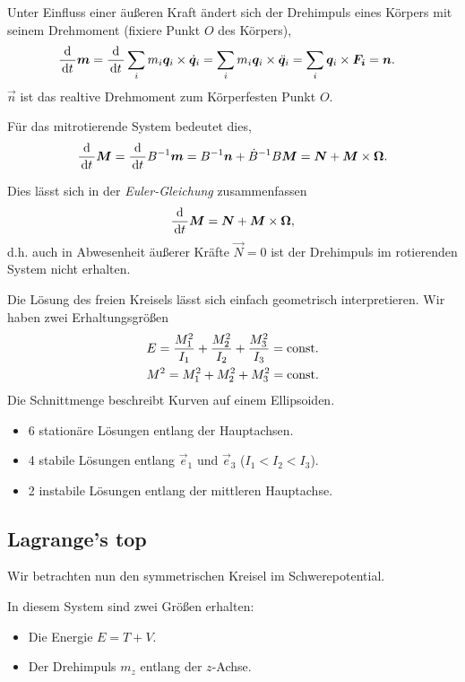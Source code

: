 Unter Einfluss einer äußeren Kraft ändert sich der Drehimpuls eines Körpers mit
seinem Drehmoment (fixiere Punkt $O$ des Körpers),
\begin{align*}
\frac{\mathrm{d}}{\,\mathrm{d} t\,}\bm{m} &= \frac{\mathrm{d}}{\,\mathrm{d} t\,}\sum_i
m_i\bm{q}_i\times\dot{\bm{q}}_i
= \sum_i m_i \bm{q}_i\times\ddot{\bm{q}}_i = \sum_i \bm{q}_i\times \bm{F_i} =
\bm{n}.
\end{align*}
$\vec{n}$ ist das realtive Drehmoment zum Körperfesten Punkt $O$.

Für das mitrotierende System bedeutet dies,
\begin{align*}
\frac{\mathrm{d}}{\,\mathrm{d} t\,}\bm{M} = \frac{\mathrm{d}}{\,\mathrm{d} t\,}B^{-1}\bm{m}
= B^{-1}\bm{n} + \dot{B}^{-1}B\bm{M} = \bm{N} + \bm{M}\times\bm{\Omega}.
\end{align*}

Dies lässt sich in der \emph{Euler-Gleichung} zusammenfassen
\begin{align*}
\frac{\mathrm{d}}{\,\mathrm{d} t\,}\bm{M} = \bm{N} + \bm{M}\times\bm{\Omega},
\end{align*}
d.h. auch in Abwesenheit äußerer Kräfte $\vec{N}=0$ ist der Drehimpuls im
rotierenden System nicht erhalten.

Die Lösung des freien Kreisels lässt sich einfach geometrisch interpretieren.
Wir haben zwei Erhaltungsgrößen
\begin{align*}
&E = \frac{M_1^2}{I_1} + \frac{M_2^2}{I_2} + \frac{M_3^2}{I_3} = \mathrm{const}.\\
&M^2 = M_1^2+M_2^2 + M_3^2 = \mathrm{const}.
\end{align*}
Die Schnittmenge beschreibt Kurven auf einem Ellipsoiden.
\begin{itemize}[label=]
  \item 6 stationäre Lösungen entlang der Hauptachsen.
  \item 4 stabile Lösungen entlang $\vec{e}_1$ und $\vec{e}_3$ ($I_1<I_2<I_3$).
  \item 2 instabile Lösungen entlang der mittleren Hauptachse.
\end{itemize}

\subsection{Lagrange's top}

Wir betrachten nun den symmetrischen Kreisel im Schwerepotential.

In diesem System sind zwei Größen erhalten:
\begin{itemize}[label=]
  \item Die Energie $E = T+V$.
  \item Der Drehimpuls $m_z$ entlang der $z$-Achse.
\end{itemize}

